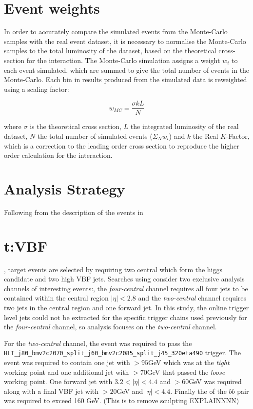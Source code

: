 	\section{Event weights}

		 In order to accurately compare the simulated events from the Monte-Carlo samples with the real event dataset, it is necessary to normalise the Monte-Carlo samples to the total luminosity of the dataset, based on the theoretical cross-section for the interaction. The Monte-Carlo simulation assigns a weight $w_i$ to each event simulated, which are summed to give the total number of events in the Monte-Carlo. Each bin in results produced from the simulated data is reweighted using a scaling factor:

		 \begin{equation}
		 w_{MC} = \frac{\sigma k L}{N}
		 \end{equation}

		 where $\sigma$ is the theoretical cross section, $L$ the integrated luminosity of the real dataset, $N$ the total number of simulated events ($\Sigma_N w_i$) and $k$ the Real $K$-Factor, which is a correction to the leading order cross section to reproduce the higher order calculation for the interaction.

	\section{\VBFHBB Analysis Strategy}
		 Following from the description of the \VBFHBB events in \section{t:VBF}, target events are selected by requiring two central \bjets which form the higgs candidate and two high \pt VBF jets. Searches using \VBFHBB consider two exclusive analysis channels of interesting events:, the \textit{four-central} channel requires all four jets to be contained within the central region $|\eta| < 2.8$ and the \textit{two-central} channel requires two jets in the central region and one forward jet. In this study, the online trigger level jets could not be extracted for the specific trigger chains used previously for the \textit{four-central} channel, so analysis focuses on the \textit{two-central} channel.

		For the \textit{two-central} channel, the event was required to pass the \verb|HLT_j80_bmv2c2070_split_j60_bmv2c2085_split_j45_320eta490| trigger. The event was required to contain one jet with \pt$>95$GeV which was \btagged at the \textit{tight} working point and one additional jet with \pt$>70$GeV that passed the \textit{loose} \btag working point. One forward jet with $3.2 < |\eta| < 4.4$ and \pt$>60$GeV was required along with a final VBF jet with \pt$>20$GeV and $|\eta| < 4.4$. Finally the \pt of the $bb$ pair was required to exceed 160 GeV. (This is to remove sculpting EXPLAINNNN)



